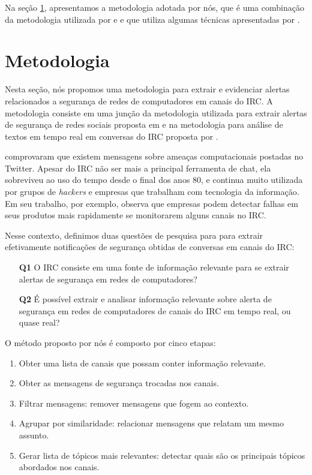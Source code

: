 \documentclass[12pt]{article}
\begin{document}
Na seção \ref{sec:metod}, apresentamos a metodologia adotada por nós, que
é uma combinação da metodologia utilizada por \cite{santos2013} e
\cite{michels2012} e que utiliza algumas técnicas apresentadas por
\cite{gainaru2010}.



\section{Metodologia} \label{sec:metod}

Nesta seção, nós propomos uma metodologia para extrair e evidenciar alertas
relacionados a segurança de redes de computadores em canais do IRC. A
metodologia consiste em uma junção da metodologia utilizada para extrair
alertas de segurança de redes sociais proposta em \cite{santos2013} e na
metodologia para análise de textos em tempo real em conversas do IRC proposta
por \cite{michels2012}.

\cite{santos2012, campiolo2013} comprovaram que existem mensagens sobre ameaças
computacionais postadas no Twitter.
%
Apesar do IRC não ser mais a principal ferramenta de chat, ela
sobreviveu ao uso do tempo desde o final dos anos 80, e continua muito
utilizada por grupos de \textit{hackers} e empresas que trabalham com
tecnologia da informação. Em seu trabalho, por exemplo, 
observa que empresas podem detectar falhas em seus produtos mais rapidamente
se monitorarem alguns canais no IRC.

Nesse contexto, definimos duas questões de pesquisa para para extrair
efetivamente notificações de segurança obtidas de conversas em canais do IRC:

\begin{itemize}
	\item[\textbf{Q1}] O IRC consiste em uma fonte de informação relevante para se
	extrair alertas de segurança em redes de computadores?
	\item[\textbf{Q2}] É possível extrair e analisar informação relevante sobre alerta
	de segurança em redes de computadores de canais do IRC em tempo real, ou 
	quase real?
\end{itemize}

O método proposto por nós é composto por cinco etapas:

\begin{enumerate}

	\item Obter uma lista de canais que possam conter informação relevante.
	\item Obter as mensagens de segurança trocadas nos canais.
	\item Filtrar mensagens: remover mensagens que fogem ao contexto.
	\item Agrupar por similaridade: relacionar mensagens que relatam um mesmo
	assunto.
	\item Gerar lista de tópicos mais relevantes: detectar quais são os
	principais tópicos abordados nos canais.
\end{enumerate}
\end{document}
